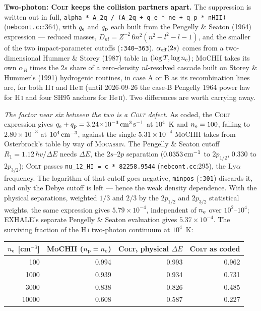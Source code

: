 \documentclass[english,a4paper]{my_memo}
\newcommand{\code}[1]{\texttt{#1}}
\newcommand{\MoCHII}{\textsc{MoCHII}}
\newcommand{\Mocassin}{\textsc{Mocassin}}
\newcommand{\Colt}{\textsc{Colt}}
\newcommand{\HI}{H\,\textsc{i}}
\newcommand{\HeII}{He\,\textsc{ii}}
\newcommand{\nelec}{n_{\rm e}}
\begin{document}
\textbf{Two-photon: \Colt{} keeps the collision partners apart.}  The
suppression is written out in full, \code{alpha * A\_2q / (A\_2q + q\_e * ne
+ q\_p * nHII)} (\code{nebcont.cc}:364), with $q_{\rm e}$ and $q_{\rm p}$
each built from the Pengelly \& Seaton (1964) expression --- reduced
masses, $D_{nl} = Z^{-2}\,6n^2(n^2-l^2-l-1)$, and the smaller of the two
impact-parameter cutoffs (\code{:340--363}).  $\alpha_{\rm eff}(2s)$ comes
from a two-dimensional Hummer \& Storey (1987) table in
$(\log T, \log \nelec)$; \MoCHII{} takes its own $\alpha_B$ times the
$2s$ share of a zero-density $nl$-resolved cascade built on Storey \&
Hummer's (1991) hydrogenic routines, in case A or B as its recombination
lines are, for both \HI{} and \HeII{} (until 2026-09-26 the case-B
Pengelly 1964 power law for \HI{} and four SH95 anchors for \HeII{}).  Two differences are worth carrying away.

\emph{The factor near six between the two is a \Colt{} defect.}  As coded,
the \Colt{} expression gives $q_{\rm e}+q_{\rm p} =
3.24{\times}10^{-3}\,{\rm cm^3\,s^{-1}}$ at $10^4$~K and $\nelec = 100$,
falling to $2.80{\times}10^{-3}$ at $10^4\,{\rm cm^{-3}}$, against the
single $5.31{\times}10^{-4}$ \MoCHII{} takes from Osterbrock's table by way
of \Mocassin{}.  The Pengelly \& Seaton cutoff $R_1 = 1.12\,\hbar v/\Delta
E$ needs $\Delta E$, the $2s$--$2p$ separation ($0.0353\,{\rm cm^{-1}}$ to
$2p_{1/2}$, $0.330$ to $2p_{3/2}$); \Colt{} passes \code{nu\_12\_HI = c *
82258.9544} (\code{nebcont.cc}:295), the Ly$\alpha$ frequency.  The
logarithm of that cutoff goes negative, \code{minpos} (\code{:301})
discards it, and only the Debye cutoff is left --- hence the weak density
dependence.  With the physical separations, weighted $1/3$ and $2/3$ by the
$2p_{1/2}$ and $2p_{3/2}$ statistical weights, the same expression gives
$5.79{\times}10^{-4}$, independent of $\nelec$ over $10^2$--$10^4$; EXHALE's
separate Pengelly \& Seaton evaluation gives $5.37{\times}10^{-4}$.  The
surviving fraction of the \HI{} two-photon continuum at $10^4$~K:

\begin{center}\small
\begin{tabular}{rrrr}
\toprule
$\nelec$ [cm$^{-3}$] & \MoCHII{} ($n_{\rm p} = \nelec$) & \Colt{}, physical $\Delta E$ & \Colt{} as coded \\
\midrule
   100 & 0.994 & 0.993 & 0.962 \\
  1000 & 0.939 & 0.934 & 0.731 \\
  3000 & 0.838 & 0.826 & 0.485 \\
 10000 & 0.608 & 0.587 & 0.227 \\
\bottomrule
\end{tabular}
\end{center}
\end{document}
